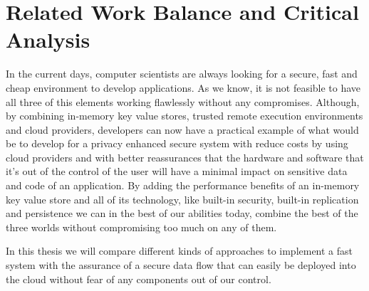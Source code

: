 \section{Related Work Balance and Critical Analysis}
\label{sec:related_work_balance_and_critical_analysis}

In the current days, computer scientists are always looking for a secure, fast and cheap environment to develop applications. As we know, it is not feasible to have all three of this elements working flawlessly without any compromises. Although, by combining in-memory key value stores, trusted remote execution environments and cloud providers, developers can now have a practical example of what would be to develop for a privacy enhanced secure system with reduce costs by using cloud providers and with better reassurances that the hardware and software that it's out of the control of the user will have a minimal impact on sensitive data and code of an application. By adding the performance benefits of an in-memory key value store and all of its technology, like built-in security, built-in replication and persistence we can in the best of our abilities today, combine the best of the three worlds without compromising too much on any of them.

In this thesis we will compare different kinds of approaches to implement a fast system with the assurance of a secure data flow that can easily be deployed into the cloud without fear of any components out of our control.